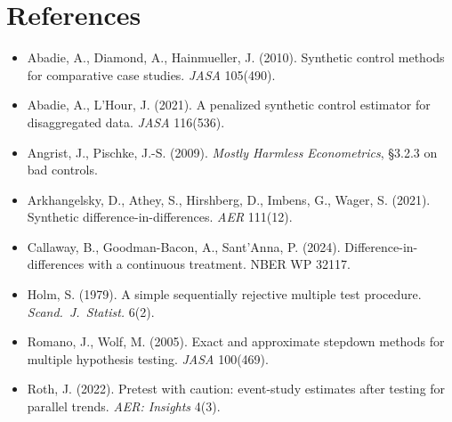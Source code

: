 \documentclass[11pt,a4paper]{article}
\begin{document}
\section*{References}
\begin{itemize}[nosep,leftmargin=1.2em]
\item Abadie, A., Diamond, A., Hainmueller, J. (2010). Synthetic control methods for comparative case studies. \emph{JASA} 105(490).
\item Abadie, A., L'Hour, J. (2021). A penalized synthetic control estimator for disaggregated data. \emph{JASA} 116(536).
\item Angrist, J., Pischke, J.-S. (2009). \emph{Mostly Harmless Econometrics}, \S3.2.3 on bad controls.
\item Arkhangelsky, D., Athey, S., Hirshberg, D., Imbens, G., Wager, S. (2021). Synthetic difference-in-differences. \emph{AER} 111(12).
\item Callaway, B., Goodman-Bacon, A., Sant'Anna, P. (2024). Difference-in-differences with a continuous treatment. NBER WP 32117.
\item Holm, S. (1979). A simple sequentially rejective multiple test procedure. \emph{Scand.\ J.\ Statist.} 6(2).
\item Romano, J., Wolf, M. (2005). Exact and approximate stepdown methods for multiple hypothesis testing. \emph{JASA} 100(469).
\item Roth, J. (2022). Pretest with caution: event-study estimates after testing for parallel trends. \emph{AER: Insights} 4(3).
\end{itemize}
\end{document}
